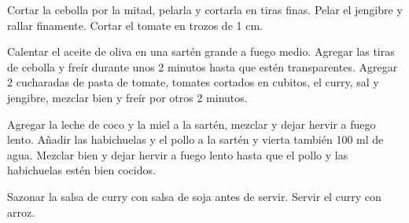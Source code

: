 \begin{recipe}
{        \step Cortar la cebolla por la mitad, pelarla y cortarla en tiras finas. Pelar el jengibre y rallar finamente. Cortar el tomate en trozos de 1 cm. 
        
        \step Calentar el aceite de oliva  en una sart\'en grande a fuego medio. Agregar las tiras de cebolla y fre\'ir durante unos 2 minutos hasta que est\'en transparentes. Agregar 2 cucharadas de pasta de tomate, tomates cortados en cubitos, el curry, sal y jengibre, mezclar bien y fre\'ir por otros 2 minutos. 
        
        \step Agregar la leche de coco y la miel a la sart\'en, mezclar y dejar hervir a fuego lento. A\~nadir las habichuelas y el pollo a la sart\'en y vierta tambi\'en 100 ml de agua. Mezclar bien y dejar hervir a fuego lento hasta que el pollo y las habichuelas est\'en bien cocidos.   
        
        \step Sazonar la salsa de curry con salsa de soja antes de servir. Servir el curry con arroz.
    }
    
    
    
    \hint{%

    }
    
\end{recipe}